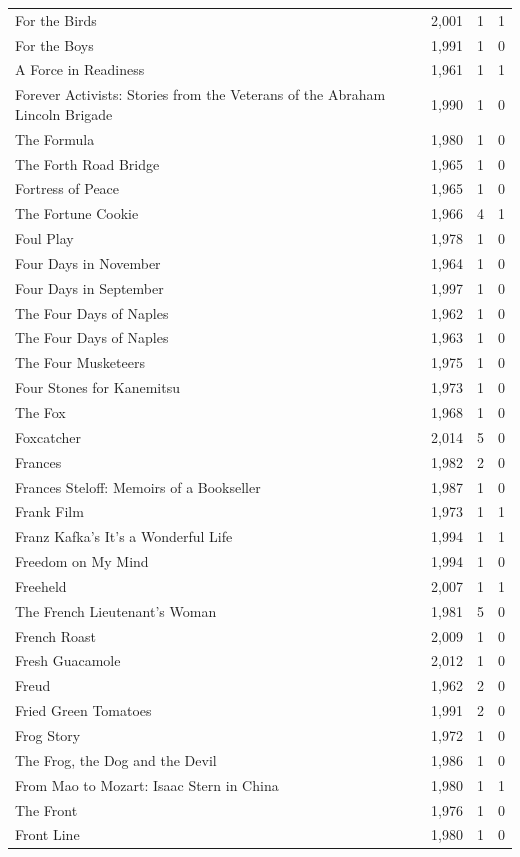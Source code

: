 \begin{tabular}{lrrr}
For the Birds & 2,001 & 1 & 1 \\
For the Boys & 1,991 & 1 & 0 \\
A Force in Readiness & 1,961 & 1 & 1 \\
Forever Activists: Stories from the Veterans of the Abraham Lincoln Brigade & 1,990 & 1 & 0 \\
The Formula & 1,980 & 1 & 0 \\
The Forth Road Bridge & 1,965 & 1 & 0 \\
Fortress of Peace & 1,965 & 1 & 0 \\
The Fortune Cookie & 1,966 & 4 & 1 \\
Foul Play & 1,978 & 1 & 0 \\
Four Days in November & 1,964 & 1 & 0 \\
Four Days in September & 1,997 & 1 & 0 \\
The Four Days of Naples & 1,962 & 1 & 0 \\
The Four Days of Naples & 1,963 & 1 & 0 \\
The Four Musketeers & 1,975 & 1 & 0 \\
Four Stones for Kanemitsu & 1,973 & 1 & 0 \\
The Fox & 1,968 & 1 & 0 \\
Foxcatcher & 2,014 & 5 & 0 \\
Frances & 1,982 & 2 & 0 \\
Frances Steloff: Memoirs of a Bookseller & 1,987 & 1 & 0 \\
Frank Film & 1,973 & 1 & 1 \\
Franz Kafka's It's a Wonderful Life & 1,994 & 1 & 1 \\
Freedom on My Mind & 1,994 & 1 & 0 \\
Freeheld & 2,007 & 1 & 1 \\
The French Lieutenant's Woman & 1,981 & 5 & 0 \\
French Roast & 2,009 & 1 & 0 \\
Fresh Guacamole & 2,012 & 1 & 0 \\
Freud & 1,962 & 2 & 0 \\
Fried Green Tomatoes & 1,991 & 2 & 0 \\
Frog Story & 1,972 & 1 & 0 \\
The Frog, the Dog and the Devil & 1,986 & 1 & 0 \\
From Mao to Mozart: Isaac Stern in China & 1,980 & 1 & 1 \\
The Front & 1,976 & 1 & 0 \\
Front Line & 1,980 & 1 & 0 \\

\end{tabular}

